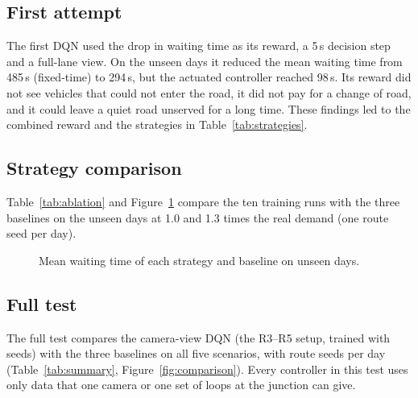 \subsection{First attempt}
The first DQN used the drop in waiting time as its reward, a 5\,s decision step and a full-lane
view. On the unseen days it reduced the mean waiting time from 485\,s (fixed-time) to 294\,s, but
the actuated controller reached 98\,s. Its reward did not see vehicles that could not enter the
road, it did not pay for a change of road, and it could leave a quiet road unserved for a long
time. These findings led to the combined reward and the strategies in Table~\ref{tab:strategies}.

\subsection{Strategy comparison}
Table~\ref{tab:ablation} and Figure~\ref{fig:ablation} compare the ten training runs with the
three baselines on the unseen days at 1.0 and 1.3 times the real demand (one route seed per day).

\begin{table}[H]
\centering\small

\caption{Strategy comparison on unseen days (16--18 January). Green: the camera rule, used as the
benchmark and teacher. Blue: the strategy chosen for the final test (warm start, camera view);
its row is the mean of three seeds.}
\label{tab:ablation}
\end{table}

\begin{figure}[H]
\centering
{}
\caption{Mean waiting time of each strategy and baseline on unseen days.}
\label{fig:ablation}
\end{figure}



\subsection{Full test}
The full test compares the camera-view DQN (the R3--R5 setup, trained with \camseedsword{} seeds) with the
three baselines on all five scenarios, with \routeseedsword{} route seeds per day (Table~\ref{tab:summary},
Figure~\ref{fig:comparison}). Every controller in this test uses only data that one camera or one
set of loops at the junction can give.

\begin{table}[H]
\centering\scriptsize
\setlength{\tabcolsep}{3.5pt}

\caption{Full test results. Mean over 3 days $\times$ \routeseeds{} route seeds; for DQN also over \trainseeds{} training
seeds ($\pm$ is the standard deviation between training seeds). Thr.\ is throughput; CO$_2$ and
fuel are per vehicle.}
\label{tab:summary}
\end{table}

